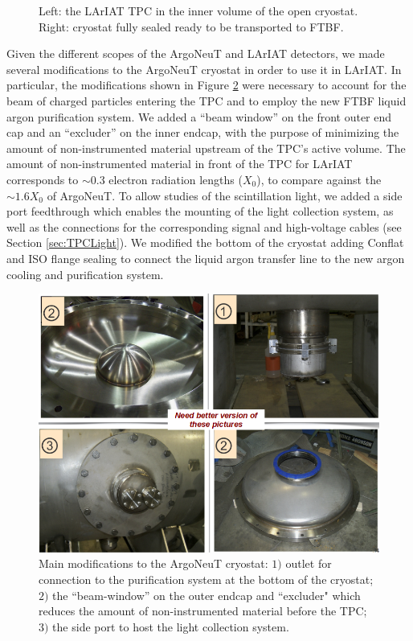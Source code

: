 \begin{figure}[htb]
\caption{ Left: the LArIAT TPC in the inner volume of the open cryostat. Right: cryostat fully sealed ready to be transported to FTBF. }
\label{fig:LArIATCryoStat}
\end{figure}

Given the different scopes of the ArgoNeuT and LArIAT detectors, we made several modifications to the ArgoNeuT cryostat in order to use it in LArIAT. In particular, the modifications  shown in Figure \ref{fig:LArIATCryoMods} were necessary to account for the beam of charged particles entering the TPC and to employ the new FTBF liquid argon purification system. 
We added a ``beam window'' on the front outer end cap and an ``excluder'' on the inner endcap, with the purpose of minimizing the amount of non-instrumented material upstream of the TPC's active volume. The amount of non-instrumented material in front of the TPC for LArIAT corresponds to $\sim$0.3 electron radiation lengths ($X_{0}$), to compare against the  $\sim 1.6 X_{0}$ of ArgoNeuT. To allow studies of the scintillation light, we added a side port feedthrough which enables the mounting of the light collection system, as well as the connections for the corresponding signal and high-voltage cables (see Section \ref{sec:TPCLight}).  We modified the bottom of the cryostat adding Conflat and ISO flange sealing to connect the liquid argon transfer line to the new argon cooling and purification system.


\begin{figure}[htb]
\centering
\includegraphics[scale=0.35]{Chapter-3/Images/CryoMods.png}
\caption{Main modifications to the ArgoNeuT cryostat: $1)$ outlet for connection to the purification system at the bottom of the cryostat; $2)$ the ``beam-window'' on the outer endcap and ``excluder"  which reduces the amount of non-instrumented material before the TPC; $3)$ the side port to host  the  light collection system.}
\label{fig:LArIATCryoMods}
\end{figure}

